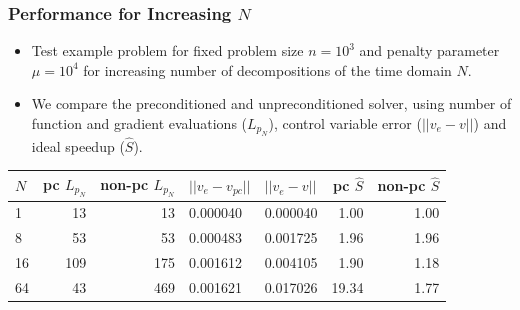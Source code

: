 \documentclass[9pt]{beamer}
\begin{document}
\begin{frame}
\frametitle{Performance for Increasing $N$}
\begin{itemize}
\item{Test example problem for fixed problem size $n=10^3$ and penalty parameter $\mu=10^4$ for increasing number of decompositions of the time domain $N$.}
\item{We compare the preconditioned and unpreconditioned solver, using number of function and gradient evaluations ($L_{p_N}$), control variable error ($||v_e-v||$) and ideal speedup ($\hat{S}$).}
\end{itemize}
\begin{table}[h]
\centering
\begin{tabular}{lrrllrr}
\toprule
{}$N$ &  pc $L_{p_N}$ &  non-pc $L_{p_N}$ &       $||v_e-v_{pc}||$ &  $||v_e-v||$  &  pc $\hat{S}$ &  non-pc $\hat{S}$ \\
\midrule
1   &     13 &      13 &  0.000040 &    0.000040 &    1.00 &        1.00 \\
8   &     53 &      53 &  0.000483 &    0.001725 &    1.96 &        1.96 \\
16  &    109 &     175 &  0.001612 &    0.004105 &    1.90 &        1.18 \\
64  &     43 &     469 &  0.001621 &    0.017026 &   19.34 &        1.77 \\
\bottomrule
\end{tabular}
\end{table}
\end{frame}
\end{document}
